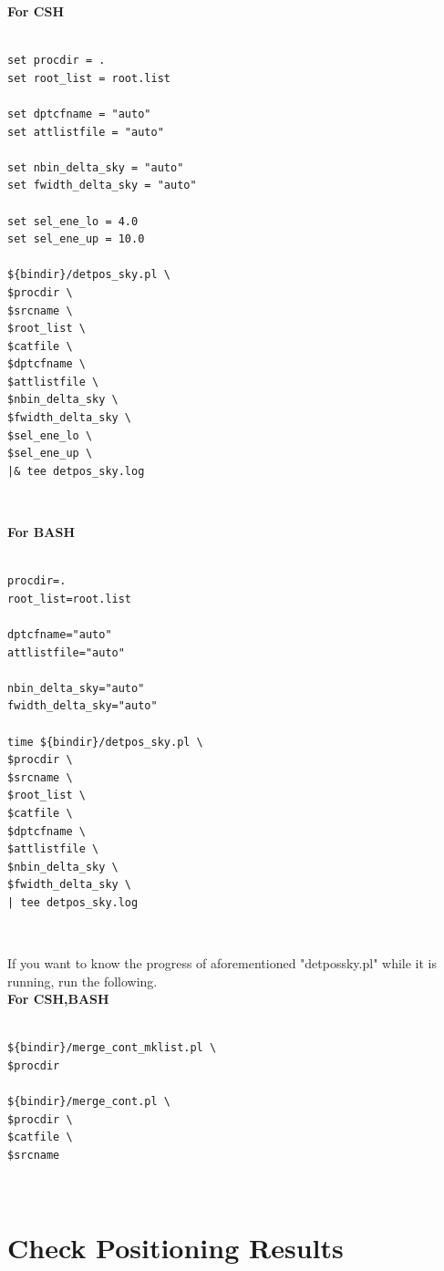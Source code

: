 \documentclass[10pt]{report}
\renewcommand{\_}{\textscale{.5}{\textbf{\textunderscore}}}
\begin{document}
\noindent\textbf{For CSH} \\

\begin{lstlisting}[frame=single]

set procdir = .
set root_list = root.list

set dptcfname = "auto"
set attlistfile = "auto"

set nbin_delta_sky = "auto"
set fwidth_delta_sky = "auto"

set sel_ene_lo = 4.0
set sel_ene_up = 10.0

${bindir}/detpos_sky.pl \
$procdir \
$srcname \
$root_list \
$catfile \
$dptcfname \
$attlistfile \
$nbin_delta_sky \
$fwidth_delta_sky \
$sel_ene_lo \
$sel_ene_up \
|& tee detpos_sky.log

\end{lstlisting}

\

\noindent\textbf{For BASH} \\

\begin{lstlisting}[frame=single]

procdir=.
root_list=root.list

dptcfname="auto"
attlistfile="auto"

nbin_delta_sky="auto"
fwidth_delta_sky="auto"

time ${bindir}/detpos_sky.pl \
$procdir \
$srcname \
$root_list \
$catfile \
$dptcfname \
$attlistfile \
$nbin_delta_sky \
$fwidth_delta_sky \
| tee detpos_sky.log

\end{lstlisting}

\

If you want to know the progress of aforementioned "detpos\_sky.pl" while it is running, run the following. \\

\noindent\textbf{For CSH,BASH} \\

\begin{lstlisting}[frame=single]

${bindir}/merge_cont_mklist.pl \
$procdir

${bindir}/merge_cont.pl \
$procdir \
$catfile \
$srcname

\end{lstlisting}

\

\section{Check Positioning Results}\label{appsec:3.3}
\end{document}
